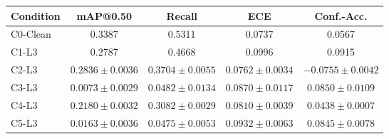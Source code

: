 \begin{tabular}{lcccc}
\toprule
Condition & mAP@0.50 & Recall & ECE & Conf.-Acc. \\
\midrule
C0-Clean & 0.3387 & 0.5311 & 0.0737 & 0.0567 \\
C1-L3 & 0.2787 & 0.4668 & 0.0996 & 0.0915 \\
C2-L3 & $0.2836 \pm 0.0036$ & $0.3704 \pm 0.0055$ & $0.0762 \pm 0.0034$ & $-0.0755 \pm 0.0042$ \\
C3-L3 & $0.0073 \pm 0.0029$ & $0.0482 \pm 0.0134$ & $0.0870 \pm 0.0117$ & $0.0850 \pm 0.0109$ \\
C4-L3 & $0.2180 \pm 0.0032$ & $0.3082 \pm 0.0029$ & $0.0810 \pm 0.0039$ & $0.0438 \pm 0.0007$ \\
C5-L3 & $0.0163 \pm 0.0036$ & $0.0475 \pm 0.0053$ & $0.0932 \pm 0.0063$ & $0.0845 \pm 0.0078$ \\
\bottomrule
\end{tabular}
